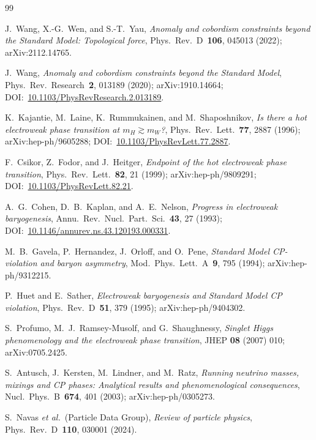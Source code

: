 \documentclass[aps,prl,twocolumn,showpacs,superscriptaddress,nofootinbib]{revtex4-2}
\begin{document}
\begin{thebibliography}{99}

J.~Wang, X.-G.~Wen, and S.-T.~Yau,
\emph{Anomaly and cobordism constraints beyond the Standard Model:
Topological force},
Phys.~Rev.~D~\textbf{106}, 045013 (2022); arXiv:2112.14765.

J.~Wang,
\emph{Anomaly and cobordism constraints beyond the Standard Model},
Phys.~Rev.~Research~\textbf{2}, 013189 (2020); arXiv:1910.14664;
DOI:~\href{https://doi.org/10.1103/PhysRevResearch.2.013189}{10.1103/PhysRevResearch.2.013189}.

K.~Kajantie, M.~Laine, K.~Rummukainen, and M.~Shaposhnikov,
\emph{Is there a hot electroweak phase transition at $m_H \gtrsim m_W$?},
Phys.~Rev.~Lett.~\textbf{77}, 2887 (1996); arXiv:hep-ph/9605288;
DOI:~\href{https://doi.org/10.1103/PhysRevLett.77.2887}{10.1103/PhysRevLett.77.2887}.

F.~Csikor, Z.~Fodor, and J.~Heitger,
\emph{Endpoint of the hot electroweak phase transition},
Phys.~Rev.~Lett.~\textbf{82}, 21 (1999); arXiv:hep-ph/9809291;
DOI:~\href{https://doi.org/10.1103/PhysRevLett.82.21}{10.1103/PhysRevLett.82.21}.

A.~G.~Cohen, D.~B.~Kaplan, and A.~E.~Nelson,
\emph{Progress in electroweak baryogenesis},
Annu.~Rev.~Nucl.~Part.~Sci.~\textbf{43}, 27 (1993);
DOI:~\href{https://doi.org/10.1146/annurev.ns.43.120193.000331}{10.1146/annurev.ns.43.120193.000331}.

M.~B.~Gavela, P.~Hernandez, J.~Orloff, and O.~Pene,
\emph{Standard Model CP-violation and baryon asymmetry},
Mod.~Phys.~Lett.~A~\textbf{9}, 795 (1994); arXiv:hep-ph/9312215.

P.~Huet and E.~Sather,
\emph{Electroweak baryogenesis and Standard Model CP violation},
Phys.~Rev.~D~\textbf{51}, 379 (1995); arXiv:hep-ph/9404302.

S.~Profumo, M.~J.~Ramsey-Musolf, and G.~Shaughnessy,
\emph{Singlet Higgs phenomenology and the electroweak phase transition},
JHEP \textbf{08} (2007) 010; arXiv:0705.2425.

S.~Antusch, J.~Kersten, M.~Lindner, and M.~Ratz,
\emph{Running neutrino masses, mixings and CP phases: Analytical
results and phenomenological consequences},
Nucl.~Phys.~B~\textbf{674}, 401 (2003); arXiv:hep-ph/0305273.

S.~Navas \textit{et al.}~(Particle Data Group),
\emph{Review of particle physics},
Phys.~Rev.~D~\textbf{110}, 030001 (2024).

\end{thebibliography}
\end{document}
